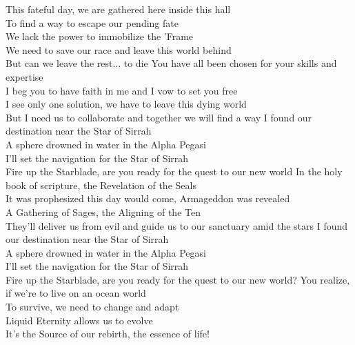 
This fateful day, we are gathered here inside this hall \\
To find a way to escape our pending fate\tab{}\\
We lack the power to immobilize the 'Frame\tab{}\\
We need to save our race and leave this world behind\\
But can we leave the rest... to die \tab{}
\hop
You have all been chosen for your skills and expertise\\
I beg you to have faith in me and I vow to set you free\\
I see only one solution, we have to leave this dying world\\
But I need us to collaborate and together we will find a way
\hops
{} I found our destination near the Star of Sirrah\tab{}\\
 A sphere drowned in water in the Alpha Pegasi\tab{}\\
 I'll set the navigation for the Star of Sirrah\tab{}\\
 Fire up the Starblade, are you ready for the quest to our new world
\hops
In the holy book of scripture, the Revelation of the Seals\tab{}\\
It was prophesized this day would come, Armageddon was revealed\\
A Gathering of Sages, the Aligning of the Ten\tab{}\tab{}\\
They'll deliver us from evil and guide us to our sanctuary amid the stars
\hops
{} I found our destination near the Star of Sirrah\tab{}\\
 A sphere drowned in water in the Alpha Pegasi\tab{}\\
 I'll set the navigation for the Star of Sirrah\tab{}\\
 Fire up the Starblade, are you ready for the quest to our new world?
\hops
You realize, if we're to live on an ocean world\tab{}\\
To survive, we need to change and adapt\tab{}\\
Liquid Eternity allows us to evolve\tab{}\\
It's the Source of our rebirth, the essence of life!
